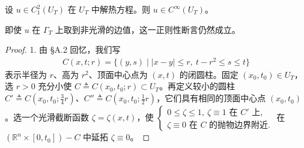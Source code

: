 \documentclass[../../main.tex]{subfiles}
\begin{document}
\begin{theorem}[光滑性]\label{theorem:ch02-heat-smoothness}设 $u\in C^2_1(U_T)$ 在 $U_T$ 中解热方程。则 $u\in C^\infty(U_T)$。
\end{theorem}

即使 $u$ 在 $\Gamma_T$ 上取到非光滑的边值，这一正则性断言仍然成立。

\begin{proof}
1. 由 \S A.2 回忆，我们写
\begin{align*}
C(x,t;r)=\{(y,s)\mid |x-y|\leqslant r,\ t-r^2\leqslant s\leqslant t\}
\end{align*}
表示半径为 $r$、高为 $r^2$、顶面中心点为 $(x,t)$ 的闭圆柱。固定 $(x_0,t_0)\in U_T$，选 $r>0$ 充分小使 $C\triangleq C(x_0,t_0;r)\subset U_T$。再定义较小的圆柱 $C'\triangleq C(x_0,t_0;\frac{3}{4}r)$、$C''\triangleq C(x_0,t_0;\frac{1}{2}r)$，它们具有相同的顶面中心点 $(x_0,t_0)$。选一个光滑截断函数 $\zeta=\zeta(x,t)$，使 $\begin{cases}0\leqslant\zeta\leqslant 1,\ \zeta\equiv 1\text{ 在 }C'\text{ 上},\\ \zeta\equiv 0\text{ 在 }C\text{ 的抛物边界附近}.\end{cases}$ 在 $(\mathbb{R}^n\times[0,t_0])-C$ 中延拓 $\zeta\equiv 0$。


\end{proof}
\end{document}
